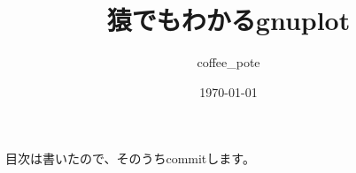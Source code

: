 \documentclass[11pt]{jsarticle}
\title{猿でもわかるgnuplot} %
\author{coffee\_pote}    %
\date{\today}        %
\begin{document}
\maketitle

目次は書いたので、そのうちcommitします。
\end{document}
